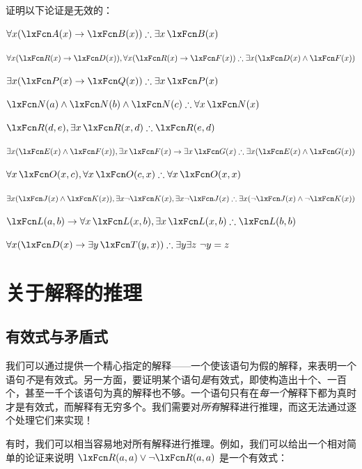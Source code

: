 \problempart
证明以下论证是无效的：


\begin{compactlist}
\item $\forall x(\atom{A}{x} \eif \atom{B}{x}) \therefore \exists x\, \atom{B}{x}$
\item $\forall x(\atom{R}{x} \eif \atom{D}{x}), \forall x(\atom{R}{x} \eif \atom{F}{x}) \therefore \exists x(\atom{D}{x} \eand \atom{F}{x})$
\item $\exists x(\atom{P}{x}\eif \atom{Q}{x}) \therefore \exists x\, \atom{P}{x}$
\item $\atom{N}{a} \eand \atom{N}{b} \eand \atom{N}{c} \therefore \forall x\, \atom{N}{x}$
\item $\atom{R}{d,e}, \exists x\, \atom{R}{x,d} \therefore \atom{R}{e,d}$
\item $\exists x(\atom{E}{x} \eand \atom{F}{x}), \exists x\, \atom{F}{x} \eif \exists x\, \atom{G}{x} \therefore \exists x(\atom{E}{x} \eand \atom{G}{x})$
\item $\forall x\, \atom{O}{x,c}, \forall x\, \atom{O}{c,x} \therefore \forall x\, \atom{O}{x,x}$
\item $\exists x(\atom{J}{x} \eand \atom{K}{x}), \exists x \enot \atom{K}{x}, \exists x \enot \atom{J}{x} \therefore \exists x(\enot \atom{J}{x} \eand \enot \atom{K}{x})$
\item $\atom{L}{a,b} \eif \forall x\, \atom{L}{x,b}, \exists x\, \atom{L}{x,b} \therefore \atom{L}{b,b}$
\item $\forall x(\atom{D}{x} \eif \exists y\, \atom{T}{y,x}) \therefore \exists y \exists z\ \enot y= z$
\end{compactlist}

\chapter{关于解释的推理}

\section{有效式与矛盾式}
我们可以通过提供一个精心指定的解释——一个使该语句为假的解释，来表明一个语句\emph{不}是有效式。另一方面，要证明某个语句\emph{是}有效式，即使构造出十个、一百个，甚至一千个该语句为真的解释也不够。一个语句只有在\emph{每一个}解释下都为真时才是有效式，而解释有无穷多个。我们需要对\emph{所有}解释进行推理，而这无法通过逐个处理它们来实现！

有时，我们可以相当容易地对所有解释进行推理。例如，我们可以给出一个相对简单的论证来说明 $\atom{R}{a,a}\eor\enot \atom{R}{a,a}$ 是一个有效式：



